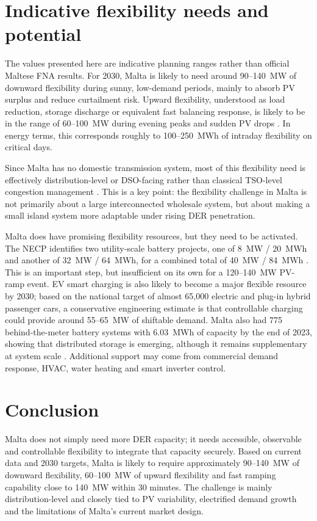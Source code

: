 \documentclass[10pt, a4paper, twoside, twocolumn]{book}
\begin{document}
\section{Indicative flexibility needs and potential}

The values presented here are indicative planning ranges rather than official Maltese FNA results. For 2030, Malta is likely to need around 90--140~MW of downward flexibility during sunny, low-demand periods, mainly to absorb PV surplus and reduce curtailment risk. Upward flexibility, understood as load reduction, storage discharge or equivalent fast balancing response, is likely to be in the range of 60--100~MW during evening peaks and sudden PV drops \cite{ewa_necp_2025,nso_electricity_2025}. In energy terms, this corresponds roughly to 100--250~MWh of intraday flexibility on critical days.

Since Malta has no domestic transmission system, most of this flexibility need is effectively distribution-level or DSO-facing rather than classical TSO-level congestion management \cite{ewa_necp_2025,rews_nationalreport_2025}. This is a key point: the flexibility challenge in Malta is not primarily about a large interconnected wholesale system, but about making a small island system more adaptable under rising DER penetration.

Malta does have promising flexibility resources, but they need to be activated. The NECP identifies two utility-scale battery projects, one of 8~MW / 20~MWh and another of 32~MW / 64~MWh, for a combined total of 40~MW / 84~MWh \cite{ewa_necp_2025}. This is an important step, but insufficient on its own for a 120--140~MW PV-ramp event. EV smart charging is also likely to become a major flexible resource by 2030; based on the national target of almost 65,000 electric and plug-in hybrid passenger cars, a conservative engineering estimate is that controllable charging could provide around 55--65~MW of shiftable demand. Malta also had 775 behind-the-meter battery systems with 6.03~MWh of capacity by the end of 2023, showing that distributed storage is emerging, although it remains supplementary at system scale \cite{ewa_necp_2025}. Additional support may come from commercial demand response, HVAC, water heating and smart inverter control.

\section{Conclusion}

Malta does not simply need more DER capacity; it needs accessible, observable and controllable flexibility to integrate that capacity securely. Based on current data and 2030 targets, Malta is likely to require approximately 90--140~MW of downward flexibility, 60--100~MW of upward flexibility and fast ramping capability close to 140~MW within 30 minutes. The challenge is mainly distribution-level and closely tied to PV variability, electrified demand growth and the limitations of Malta’s current market design.
\end{document}
